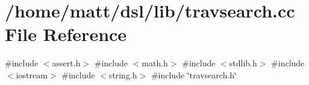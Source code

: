 \section{/home/matt/dsl/lib/travsearch.cc \-File \-Reference}
\label{travsearch_8cc}
{\ttfamily \#include $<$assert.\-h$>$}\*
{\ttfamily \#include $<$math.\-h$>$}\*
{\ttfamily \#include $<$stdlib.\-h$>$}\*
{\ttfamily \#include $<$iostream$>$}\*
{\ttfamily \#include $<$string.\-h$>$}\*
{\ttfamily \#include \char`\"{}travsearch.\-h\char`\"{}}\*

